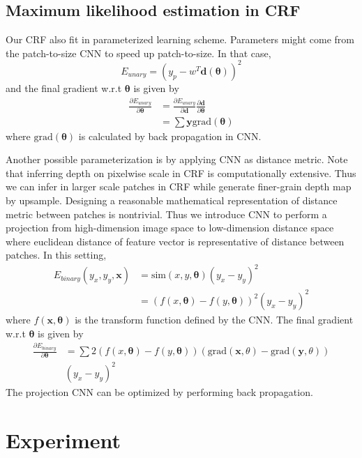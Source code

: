 \documentclass[10pt,twocolumn,letterpaper]{article}
\begin{document}
\subsection{Maximum likelihood estimation in CRF}
Our CRF also fit in parameterized learning scheme. Parameters might come from the patch-to-size CNN to speed up patch-to-size. In that case, 
\begin{equation}
E_{unary} = (y_p - w^T\mathbf{d}(\mathbf{\theta}))^2
\end{equation}
and the final gradient w.r.t $\mathbf{\theta}$ is given by
\begin{align}
\frac{\partial E_{unary}}{\partial \mathbf{\theta}} &= \frac{\partial E_{unary}}{\partial \mathbf{d}}\frac{\partial \mathbf{d}}{\partial \mathbf{\theta}}
\\ & = \sum \mathbf{y} \text{grad}(\mathbf{\theta})
\end{align}
where $\text{grad}(\mathbf{\theta})$ is calculated by back propagation in CNN.
\par
Another possible parameterization is by applying CNN as distance metric. Note that inferring depth on pixelwise scale in CRF is computationally extensive. Thus we can infer in larger scale patches in CRF while generate finer-grain depth map by upsample. Designing a reasonable mathematical representation of distance metric between patches is nontrivial. Thus we introduce CNN to perform a projection from high-dimension image space to low-dimension distance space where euclidean distance of feature vector is representative of distance between patches. In this setting, 
\begin{align}
E_{binary}(y_x, y_y, \mathbf{x}) &= \text{sim}(x, y, \mathbf{\theta}) (y_x-y_y)^2
\\ &= (f(x, \mathbf{\theta})-f(y, \mathbf{\theta}))^2(y_x-y_y)^2
\end{align}
where $f(\mathbf{x}, \mathbf{\theta})$ is the transform function defined by the CNN. The final gradient w.r.t $\mathbf{\theta}$ is given by
\begin{align}
\frac{\partial E_{binary}}{\partial \mathbf{\theta}} &=\sum 2(f(x, \mathbf{\theta})-f(y, \mathbf{\theta}))(\text{grad}(\mathbf{x}, \theta)-\text{grad}(\mathbf{y}, \theta))
\\& (y_x-y_y)^2
\end{align}
The projection CNN can be optimized by performing back propagation.

\section{Experiment}
\end{document}
